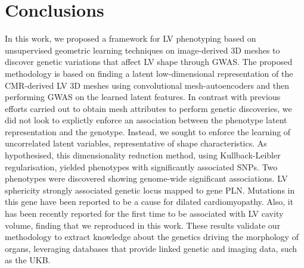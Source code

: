 \section*{Conclusions}
In this work, we proposed a framework for LV phenotyping based on unsupervised geometric learning techniques on image-derived 3D meshes to discover genetic variations that affect LV shape through GWAS. The proposed methodology is based on finding a latent low-dimensional representation of the CMR-derived LV 3D meshes using convolutional mesh-autoencoders and then performing GWAS on the learned latent features. In contrast with previous efforts carried out to obtain mesh attributes to perform genetic discoveries, we did not look to explictly enforce an association between the phenotype latent representation and the genotype. Instead, we sought to enforce the learning of uncorrelated latent variables, representative of shape characteristics. %
As hypothesised, this dimensionality reduction method, using Kullback-Leibler regularisation, yielded phenotypes with significantly associated SNPs. 
Two phenotypes were discovered showing genome-wide significant associations. LV sphericity strongly associated genetic locus mapped to gene PLN. Mutations in this gene have been reported to be a cause for dilated cardiomyopathy. Also, it has been recently reported for the first time to be associated with LV cavity volume, finding that we reproduced in this work. 
These results validate our methodology to extract knowledge about the genetics driving the morphology of organs, leveraging databases that provide linked genetic and imaging data, such as the UKB.

